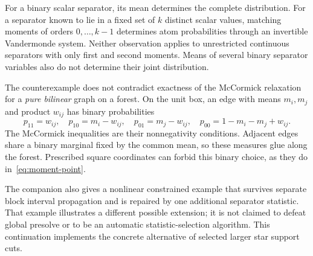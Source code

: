For a binary scalar separator, its mean determines the complete
distribution. For a separator known to lie in a fixed set of $k$
distinct scalar values, matching moments of orders $0,\ldots,k-1$
determines atom probabilities through an invertible Vandermonde system.
Neither observation applies to unrestricted continuous separators with
only first and second moments. Means of several binary separator
variables also do not determine their joint distribution.

The counterexample does not contradict exactness of the McCormick
relaxation for a \emph{pure bilinear} graph on a forest. On the unit
box, an edge with means $m_i,m_j$ and product $w_{ij}$ has binary
probabilities
\[
p_{11}=w_{ij},\quad p_{10}=m_i-w_{ij},\quad
p_{01}=m_j-w_{ij},\quad p_{00}=1-m_i-m_j+w_{ij}.
\]
The McCormick inequalities are their nonnegativity conditions. Adjacent
edges share a binary marginal fixed by the common mean, so these
measures glue along the forest. Prescribed square coordinates can
forbid this binary choice, as they do in~\eqref{eq:moment-point}.

The companion
also gives a nonlinear constrained example that survives separate
block interval propagation and is repaired by one additional separator
statistic. That example illustrates a different possible extension;
it is not claimed to defeat global presolve or to be an automatic
statistic-selection algorithm. This continuation implements the
concrete alternative of selected larger star support cuts.
